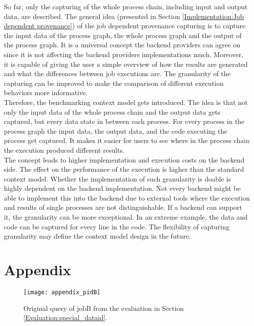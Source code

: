 \documentclass[draft,final]{vutinfth} %
\begin{document}
So far, only the capturing of the whole process chain, including input and output data, are described. The general idea (presented in Section \ref{Implementation:Job dependent provenance}) of the job dependent provenance capturing is to capture the input data of the process graph, the whole process graph and the output of the process graph. It is a universal concept the backend providers can agree on since it is not affecting the backend providers implementations much. Moreover, it is capable of giving the user a simple overview of how the results are generated and what the differences between job executions are. The granularity of the capturing can be improved to make the comparison of different execution behaviors more informative. \\
Therefore, the benchmarking context model gets introduced. The idea is that not only the input data of the whole process chain and the output data gets captured, but every data state in between each process. For every process in the process graph the input data, the output data, and the code executing the process get captured. It makes it easier for users to see where in the process chain the execution produced different results.\\ The concept leads to higher implementation and execution costs on the backend side. The effect on the performance of the execution is higher than the standard context model. Whether the implementation of such granularity is doable is highly dependent on the backend implementation. Not every backend might be able to implement this into the backend due to external tools where the execution and results of single processes are not distinguishable. If a backend can support it, the granularity can be more exceptional. In an extreme example, the data and code can be captured for every line in the code. The flexibility of capturing granularity may define the context model design in the future.

\chapter{Appendix}\label{Appendix}

\begin{figure}[h]
	\centering
	\texttt{[image: appendix\_pidB]}
	\caption{Original query of jobB from the evaluation in Section \ref{Evaluation:special_dataid}.}
	\label{fig:appendix_pidB} %
\end{figure}
\end{document}
